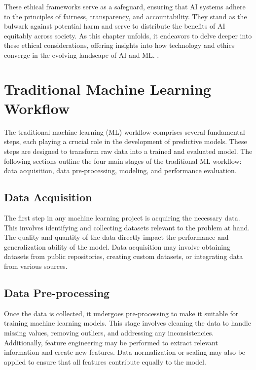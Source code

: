 \documentclass[12pt,a4paper,openright,twoside]{book}
\begin{document}
These ethical frameworks serve as a safeguard, ensuring that AI systems adhere to the principles of fairness, transparency, and accountability. They stand as the bulwark against potential harm and serve to distribute the benefits of AI equitably across society. As this chapter unfolds, it endeavors to delve deeper into these ethical considerations, offering insights into how technology and ethics converge in the evolving landscape of AI and ML. \cite{GRUETZEMACHER2022102884}.

\newpage
\section{Traditional Machine Learning Workflow}

The traditional machine learning (ML) workflow comprises several fundamental steps, each playing a crucial role in the development of predictive models. These steps are designed to transform raw data into a trained and evaluated model. The following sections outline the four main stages of the traditional ML workflow: data acquisition, data pre-processing, modeling, and performance evaluation.

\subsection{Data Acquisition}

The first step in any machine learning project is acquiring the necessary data. This involves identifying and collecting datasets relevant to the problem at hand. The quality and quantity of the data directly impact the performance and generalization ability of the model. Data acquisition may involve obtaining datasets from public repositories, creating custom datasets, or integrating data from various sources.

\subsection{Data Pre-processing}

Once the data is collected, it undergoes pre-processing to make it suitable for training machine learning models. This stage involves cleaning the data to handle missing values, removing outliers, and addressing any inconsistencies. Additionally, feature engineering may be performed to extract relevant information and create new features. Data normalization or scaling may also be applied to ensure that all features contribute equally to the model.
\end{document}
